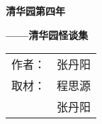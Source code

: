 \documentclass[UTF-8,openright]{ctexbook}
\begin{document}

\begin{titlepage}
	\centering
	\linespread{1.2}
	\vspace*{1cm}
	{ \textbf{清华园第四年}\par}
	\vspace{0.5cm}
	{ \textbf{——清华园怪谈集}\par}
	\vfill
	\begin{table}[!hb]
		\LARGE
		\centering
		\begin{tabular}{rc}
			作者： &	张丹阳 \\
			取材： &	程思源 \\
			&			张丹阳
		\end{tabular}
		\vspace{1cm}
	\end{table}
\end{titlepage}

\pagestyle{headings}


\tableofcontents
\newpage






\end{document}
